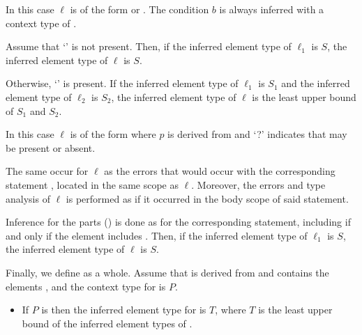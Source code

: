 \documentclass[makeidx]{article}
\begin{document}
{\LMHash{}%
In this case $\ell$ is of the form
 or
.
The condition $b$ is always inferred with a context type of .

Assume that `' is not present.
Then, if the inferred element type of $\ell_1$ is $S$,
the inferred element type of $\ell$ is $S$.

Otherwise, `' is present.
If the inferred element type of $\ell_1$ is $S_1$ and
the inferred element type of $\ell_2$ is $S_2$,
the inferred element type of $\ell$ is
the least upper bound of $S_1$ and $S_2$.
\EndCase

\LMHash{}%
%
In this case $\ell$ is of the form
where $p$ is derived from  and
`\AWAIT?' indicates that \AWAIT{} may be present or absent.

The same  occur for $\ell$ as
the errors that would occur with the corresponding \FOR{} statement
,
located in the same scope as $\ell$.
Moreover, the errors and type analysis of $\ell$ is performed
as if it occurred in the body scope of said \FOR{} statement.

Inference for the parts
()
is done as for the corresponding \FOR{} statement,
including \AWAIT{} if and only if the element includes \AWAIT.
Then, if the inferred element type of $\ell_1$ is $S$,
the inferred element type of $\ell$ is $S$.

\vspace{3mm}
\EndCase

\LMHash{}%
Finally, we define
as a whole.
%
Assume that  is derived from 
and contains the elements ,
and the context type for  is $P$.

\begin{itemize}
\item
  If $P$ is \FreeContext{} then
  the inferred element type for  is $T$,
  where $T$ is the least upper bound of
  the inferred element types of .


\end{itemize}}
\end{document}
